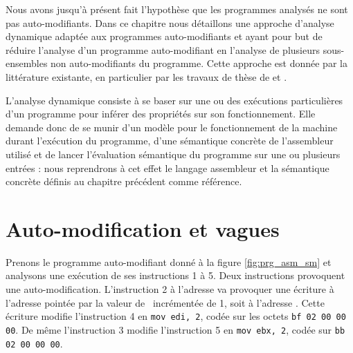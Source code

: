 Nous avons jusqu'à présent fait l'hypothèse que les programmes analysés ne sont pas auto-modifiants.
Dans ce chapitre nous détaillons une approche d'analyse dynamique adaptée aux programmes auto-modifiants et ayant pour but de réduire l'analyse d'un programme auto-modifiant en l'analyse de plusieurs sous-ensembles non auto-modifiants du programme.
Cette approche est donnée par la littérature existante, en particulier par les travaux de thèse de  \cite{Reynaud2010} et  \cite{Calvet2013}.

L'analyse dynamique consiste à se baser sur une ou des exécutions particulières d'un programme pour inférer des propriétés sur son fonctionnement.
Elle demande donc de se munir d'un modèle pour le fonctionnement de la machine durant l'exécution du programme, d'une sémantique concrète de l'assembleur utilisé et de lancer l'évaluation sémantique du programme sur une ou plusieurs entrées : nous reprendrons à cet effet le langage assembleur et la sémantique concrète définis au chapitre précédent comme référence.

\section{Auto-modification et vagues}
Prenons le programme auto-modifiant donné à la figure \ref{fig:prg_asm_sm} et analysons une exécution de ses instructions 1 à 5.
Deux instructions provoquent une auto-modification.
L'instruction 2 à l'adresse  va provoquer une écriture à l'adresse pointée par la valeur de \eax\ incrémentée de 1, soit à l'adresse . Cette écriture modifie l'instruction 4 en \texttt{mov edi, 2}, codée sur les octets \texttt{bf 02 00 00 00}. De même l'instruction 3 modifie l'instruction 5 en \texttt{mov ebx, 2}, codée sur \texttt{bb 02 00 00 00}.
 
